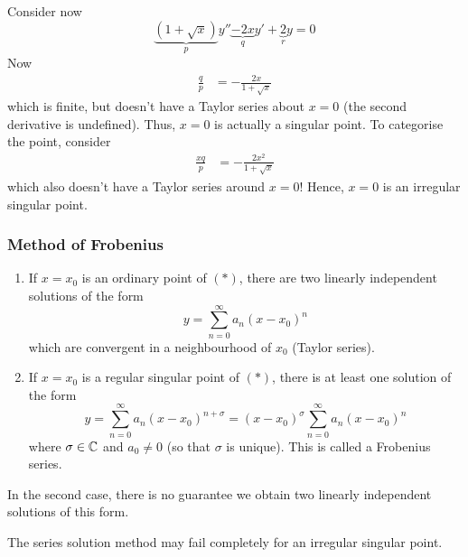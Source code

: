 \documentclass{../template/note}
\begin{document}
    \begin{example}
        Consider now
        \[
            \underbrace{(1+\sqrt x)}_{p}y'' \underbrace{- 2x}_{q}y' + \underbrace{2}_{r}y = 0
        \]
        Now
        \begin{align*}
            \frac{q}{p} &= -\frac{2x}{1+\sqrt x}
        \end{align*}
        which is finite, but doesn't have a Taylor series about \(x=0\) (the second derivative is undefined). Thus, \(x=0\) is actually a singular point. To categorise the point, consider
        \begin{align*}
            \frac{xq}{p} &= -\frac{2x^2}{1 +\sqrt x}
        \end{align*}
        which also doesn't have a Taylor series around \(x=0\)! Hence, \(x=0\) is an irregular singular point.        
    \end{example}
    
    \subsubsection{Method of Frobenius}

    \begin{theorem}[Fuch]
        \begin{enumerate}[label=\protect\circled{\arabic*}]
            \item If \(x=x_0\) is an ordinary point of \((*)\), there are two linearly independent solutions of the form
            \[
                y = \sum_{n=0}^\infty a_n (x-x_0)^n
            \]
            which are convergent in a neighbourhood of \(x_0\) (Taylor series).
            \item If \(x=x_0\) is a regular singular point of \((*)\), there is at least one solution of the form
            \[
                y = \sum_{n=0}^\infty a_n (x-x_0)^{n+\sigma} = (x-x_0)^\sigma \sum_{n=0}^\infty a_n (x-x_0)^n
            \]
            where \(\sigma \in \mathbb C\) and \(a_0 \neq 0\) (so that \(\sigma\) is unique). This is called a Frobenius series.
        \end{enumerate}
    \end{theorem}
    
    \begin{remark*}
        In the second case, there is no guarantee we obtain two linearly independent solutions of this form.
    \end{remark*}
    
    \begin{remark*}
        The series solution method may fail completely for an irregular singular point.
    \end{remark*}
    
\end{document}
